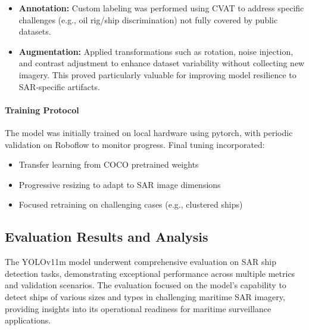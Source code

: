 \documentclass{article}
\begin{document}
	\begin{itemize}
		\item \textbf{Annotation:} Custom labeling was performed using CVAT to address specific challenges (e.g., oil rig/ship discrimination) not fully covered by public datasets. \item \textbf{Augmentation:} Applied transformations such as rotation, noise injection, and contrast adjustment to enhance dataset variability without collecting new imagery. This proved particularly valuable for improving model resilience to SAR-specific artifacts. \end{itemize}
	
	\paragraph{Training Protocol}
	
	The model was initially trained on local hardware using \acrshort{pytorch}, with periodic validation on Roboflow to monitor progress. Final tuning incorporated:
	
	\begin{itemize}
		\item Transfer learning from COCO pretrained weights
		\item Progressive resizing to adapt to SAR image dimensions
		\item Focused retraining on challenging cases (e.g., clustered ships)
	\end{itemize}
	
	\subsection{Evaluation Results and Analysis}
	The YOLOv11m model underwent comprehensive evaluation on SAR ship detection tasks, demonstrating exceptional performance across multiple metrics and validation scenarios. The evaluation focused on the model's capability to detect ships of various sizes and types in challenging maritime SAR imagery, providing insights into its operational readiness for maritime surveillance applications.
	
\end{document}
